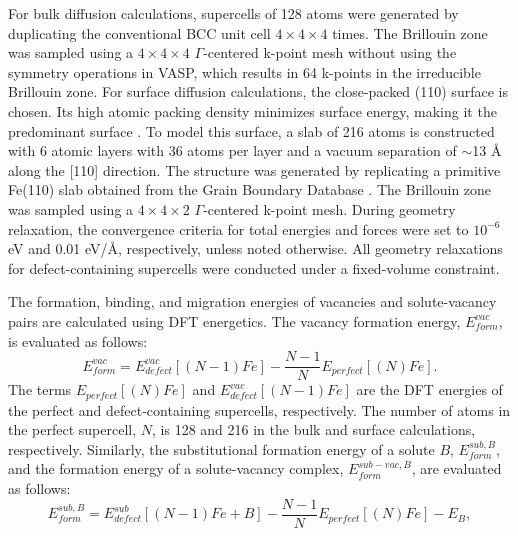 \documentclass[preprint,12pt]{elsarticle}
\begin{document}
For bulk diffusion calculations, supercells of 128 atoms were generated by duplicating the conventional BCC unit cell $4\times4\times4$ times.  The Brillouin zone was sampled using a $4\times4\times4$ $\Gamma$-centered k-point mesh without using the symmetry operations in VASP, which results in 64 k-points in the irreducible Brillouin zone. 
For surface diffusion calculations, the close-packed (110) surface is chosen. Its high atomic packing density minimizes surface energy, making it the predominant surface \cite{tran2016surface}. To model this surface, a slab of 216 atoms is constructed with 6 atomic layers with 36 atoms per layer and a vacuum separation of $\sim$13 {\AA} along the [110] direction. The structure was generated by replicating a primitive Fe(110) slab obtained from the Grain Boundary Database \cite{tran2016surface, zheng_grain_2020}. The Brillouin zone was sampled using a $4\times4\times2$ $\Gamma$-centered k-point mesh. During geometry relaxation, the convergence criteria for total energies and forces were set to $10^{-6}$ eV and 0.01 eV/{\AA}, respectively, unless noted otherwise. All geometry relaxations for defect-containing supercells were conducted under a fixed-volume constraint.

The formation, binding, and migration energies of vacancies and solute-vacancy pairs are calculated using DFT energetics. The vacancy formation energy, $E_{form}^{vac}$, is evaluated as follows:
\begin{equation}
\label{eq_Ef_vac}
   E_{form}^{vac} = E^{vac}_{defect}[(N-1)Fe] - \frac{N-1}{N} E_{perfect}[(N) Fe] .
\end{equation}
The terms $E_{perfect}[(N) Fe]$ and $E^{vac}_{defect}[(N-1)Fe]$ are the DFT energies of the perfect and defect-containing supercells, respectively. The number of atoms in the perfect supercell, $N$, is 128 and 216 in the bulk and surface calculations, respectively. Similarly, the substitutional formation energy of a solute $B$, $E_{form}^{sub,B}$, and the formation energy of a solute-vacancy complex, $E_{form}^{sub-vac,B}$, are evaluated as follows:
\begin{equation}
\label{eq_Ef_sub}
    E_{form}^{sub,B} = E_{defect}^{sub}[(N-1)Fe + B] - \frac{N-1}{N}E_{perfect}[(N) Fe] - E_{B},
\end{equation}
\end{document}
